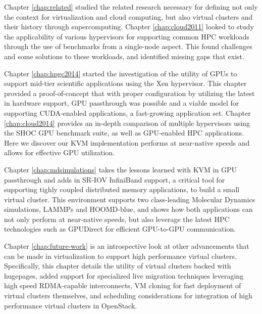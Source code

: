
Chapter \ref{chap:related} studied the related research necessary for defining not only the context for virtualization and cloud computing, but also virtual clusters and their history through supercomputing.  Chapter \ref{chap:cloud2011} looked to study the applicability of various hypervisors for supporting common HPC workloads through the use of benchmarks from a single-node aspect.  This found challenges and some solutions to these workloads, and identified missing gaps that exist. 

Chapter \ref{chap:hpgc2014} started the investigation of the utility of GPUs to support mid-tier scientific applications using the Xen hypervisor. This chapter provided a proof-of-concept that with proper configuration by utilizing the latest in hardware support, GPU passthrough was possible and a viable model for supporting CUDA-enabled applications, a fast-growing application set. Chapter \ref{chap:cloud2014} provides an in-depth comparison of multiple hypervisors using the SHOC GPU benchmark suite, as well as GPU-enabled HPC applications. Here we discover our KVM implementation performs at near-native speeds and allows for effective GPU utilization. 

Chapter \ref{chap:mdsimulations} takes the lessons learned with KVM in GPU passthrough and adds in SR-IOV InfiniBand support, a critical tool for supporting tighly coupled distributed memory applications, to build a small virtual cluster. This environment supports two class-leading Molecular Dynamics simulations, LAMMPs and HOOMD-blue, and shows how both applications can not only perform at near-native speeds, but also leverage the latest HPC technologies such as GPUDirect for efficient GPU-to-GPU communication. %

Chapter \ref{chap:future-work} is an introspective look at other advancements that can be made in virtualization to support high performance virtual clusters. Specifically, this chapter details the utility of virtual clusters backed with hugepages, added support for specialized live migration techniques leveraging high speed RDMA-capable interconnects, VM cloning for fast deployment of virtual clusters themselves, and scheduling considerations for integration of high performance virtual clusters in OpenStack.  


